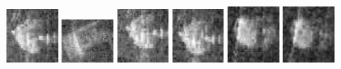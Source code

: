 \begin{figure}
    \includegraphics[width=0.15\textwidth]{chapters/images/dataset/all-class-images/drinkCarton/drinkCarton-322.jpg}
    \includegraphics[width=0.15\textwidth]{chapters/images/dataset/all-class-images/drinkCarton/drinkCarton-105.jpg}
    \includegraphics[width=0.15\textwidth]{chapters/images/dataset/all-class-images/drinkCarton/drinkCarton-279.jpg}
    \includegraphics[width=0.15\textwidth]{chapters/images/dataset/all-class-images/drinkCarton/drinkCarton-245.jpg}
    \includegraphics[width=0.15\textwidth]{chapters/images/dataset/all-class-images/drinkCarton/drinkCarton-17.jpg}
    \includegraphics[width=0.15\textwidth]{chapters/images/dataset/all-class-images/drinkCarton/drinkCarton-7.jpg}
    

\end{figure}
